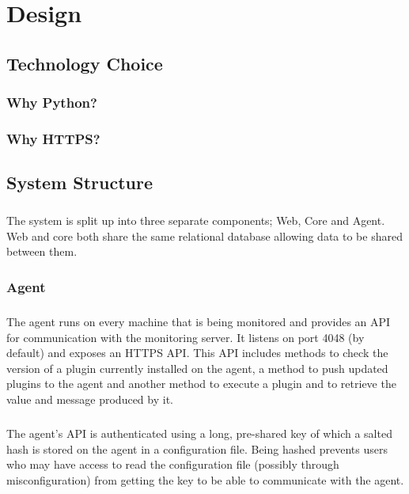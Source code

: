\documentclass[bsc,logo,twoside]{infthesis}
\begin{document}
	
\chapter{Design}
\section{Technology Choice}
\subsection{Why Python?}
\subsection{Why HTTPS?}

\section{System Structure}
\paragraph*{}
	The system is split up into three separate components; Web, Core and Agent.
	Web and core both share the same relational database allowing data to be
	shared between them.
	
\subsection{Agent}
\paragraph*{}
	The agent runs on every machine that is being monitored and provides an API
	for communication with the monitoring server.  It listens on port 4048 (by
	default) and exposes an HTTPS API.  This API includes methods to check the
	version of a plugin currently installed on the agent, a method to push updated
	plugins to the agent and another method to execute a plugin and to retrieve
	the value and message produced by it.
	
\paragraph*{}
	The agent's API is authenticated using a long, pre-shared key of which a salted
	hash is stored on the agent in a configuration file.  Being hashed prevents
	users who may have access to read the configuration file (possibly through
	misconfiguration) from getting the key to be able to communicate with the agent.
	
\end{document}

